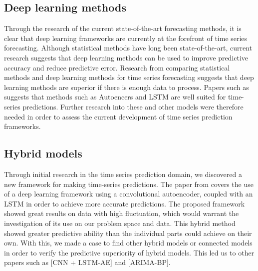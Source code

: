 \subsection{Deep learning methods}
Through the research of the current state-of-the-art forecasting methods,
it is clear that deep learning frameworks are currently at the forefront of time series forecasting.
Although statistical methods have long been state-of-the-art, current research suggests that deep learning methods can be used to improve predictive accuracy and reduce predictive error.
Research from \cite{Makridakis2018} comparing statistical methods and deep learning methods for time series forecasting suggests that deep learning methods are superior if there is enough data to process.
Papers such as \cite{Laptev} suggests that methods such as Autoencers and LSTM are well suited for time-series predictions.
Further research into these and other models were therefore needed in order to assess the current development of time series prediction frameworks.


\subsection{Hybrid models}
Through initial research in the time series prediction domain,
we discovered a new framework for making time-series predictions.
The paper from \cite{Zhao2019} covers the use of a deep learning framework using a convolutional autoencoder,
coupled with an LSTM in order to achieve more accurate predictions.
The proposed framework showed great results on data with high fluctuation,
which would warrant the investigation of its use on our problem space and data.
This hybrid method showed greater predictive ability than the individual parts could achieve on their own.
With this, we made a case to find other hybrid models or connected models in order to verify the predictive superiority of hybrid models.
This led us to other papers such as [CNN + LSTM-AE] and [ARIMA-BP].




\iffalse
{}

